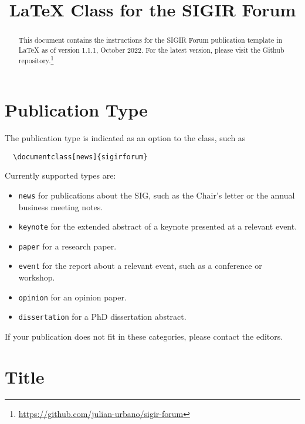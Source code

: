 \documentclass[news]{sigirforum}
\begin{document}
\title{\LaTeX\xspace Class for the SIGIR Forum}


\maketitle 
\begin{abstract}
This document contains the instructions for the SIGIR Forum publication template in \LaTeX\xspace as of version 1.1.1, October 2022. For the latest version, please visit the Github repository.\footnote{\url{https://github.com/julian-urbano/sigir-forum}}
\end{abstract}

\section{Publication Type}

The publication type is indicated as an option to the class, such as
\begin{verbatim}
  \documentclass[news]{sigirforum}
\end{verbatim}
Currently supported types are:
\begin{itemize}
	\item \texttt{news} for publications about the SIG, such as the Chair's letter or the annual business meeting notes.
	\item \texttt{keynote} for the extended abstract of a keynote presented at a relevant event.
	\item \texttt{paper} for a research paper.
	\item \texttt{event} for the report about a relevant event, such as a conference or workshop.
	\item \texttt{opinion} for an opinion paper.
	\item \texttt{dissertation} for a PhD dissertation abstract.
\end{itemize}

If your publication does not fit in these categories, please contact the editors.

\section{Title}
\end{document}
